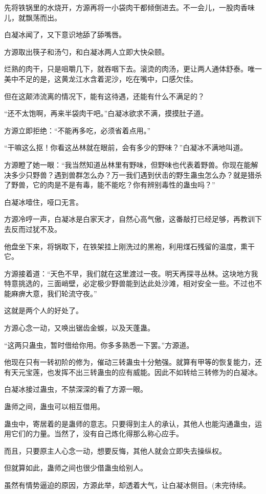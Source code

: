 \begin{this_body}
先将铁锅里的水烧开，方源再将一小袋肉干都倾倒进去。不一会儿，一股肉香味儿，就飘荡而出。

白凝冰闻了，又下意识地舔了舔嘴唇。

方源取出筷子和汤勺，和白凝冰两人立即大快朵颐。

烂熟的肉干，只是咀嚼几下，就吞咽下去。滚烫的肉汤，更让两人通体舒泰。唯一美中不足的是，这黄龙江水含着泥沙，吃在嘴中，口感欠佳。

但在这颠沛流离的情况下，能有这待遇，还能有什么不满足的？

“还不太饱啊，再来半袋肉干吧。”白凝冰欲求不满，摸摸肚子道。

方源立即拒绝：“不能再多吃，必须省着点用。”

“干嘛这么抠！你看这丛林就在眼前，会有多少的野味？”白凝冰不满地叫道。

方源瞪了她一眼：“我当然知道丛林里有野味，但野味也代表着野兽。你现在能解决多少只野兽？遇到兽群怎么办？万一我们遇到伏击的野生蛊虫怎么办？就是猎杀了野兽，它的肉是不是有毒，能不能吃？你有辨别毒性的蛊虫吗？”

白凝冰噎住，哑口无言。

方源冷哼一声，白凝冰是白家天才，自然心高气傲，这番敲打已经足够，再教训下去反而过犹不及。

他盘坐下来，将锅取下，在铁架挂上刚洗过的黑袍，利用煤石残留的温度，熏干它。

方源接着道：“天色不早，我们就在这里渡过一夜。明天再探寻丛林。这块地方我特意挑选的，三面峭壁，必定极少野兽能到达此处沙滩，相对安全一些。不过也不能麻痹大意，我们轮流守夜。”

这就是两个人的好处了。

方源心念一动，又唤出锯齿金蜈，以及天蓬蛊。

“这两只蛊虫，暂时借给你用。你多多熟悉一下罢。”方源道。

他现在只有一转初阶的修为，催动三转蛊虫十分勉强。就算有甲等的恢复能力，还有天元宝莲，也发挥不出三转蛊虫的应有威能。因此不如转给三转修为的白凝冰。

白凝冰接过蛊虫，不禁深深的看了方源一眼。

蛊师之间，蛊虫可以相互借用。

蛊虫中，寄居着的是蛊师的意志。只要得到主人的承认，其他人也能沟通蛊虫，运用它们的力量。当然了，没有自己炼化得那么称心应手。

而且，只要原主人心念一动，想要反悔，其他人就会立即失去操纵权。

但就算如此，蛊师之间也很少借蛊虫给别人。

虽然有情势逼迫的原因，方源此举，却透着大气，让白凝冰侧目。(未完待续。

\end{this_body}

